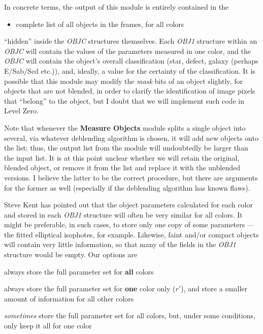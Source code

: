   In concrete terms, the output of this module is 
entirely contained in the 

\begin {itemize}
  \item complete list of all objects in the frames, for all colors
\end {itemize}

``hidden'' inside the {\it OBJC} structures themselves.  Each {\it OBJ1}
structure within an {\it OBJC} will contain the values of
the parameters measured in one color,
and the {\it OBJC} will contain the object's overall classification (star,
defect, galaxy (perhaps E/Sab/Scd etc.)), and, ideally,
a value for the certainty of the classification.
It is possible that this module may modify the {\it mask}
bits of an object slightly, for objects that are not
blended, in order to clarify the identification of image
pixels that ``belong'' to the object, but I doubt that
we will implement such code in Level Zero.

Note that whenever the {\bf Measure Objects} module 
splits a single object into several, via whatever deblending 
algorithm is chosen, it will add new objects onto the list;
thus, the output list from the module will undoubtedly be larger
than the input list.  It is at this point unclear whether we
will retain the original, blended object, or remove it from
the list and replace it with the unblended versions.  I believe
the latter to be the correct procedure, but there are arguments
for the former as well (especially if the deblending algorithm
has known flaws).

  Steve Kent has pointed out that the object parameters
calculated for each color and stored in 
each {\it OBJ1} structure will often be very similar for all colors.  
It might be preferable, in such cases, to store only one copy
of some parameters --- the fitted elliptical isophotes, for example.
Likewise, faint and/or compact objects will contain very
little information, so that many of the fields in the {\it OBJ1}
structure would be empty.
Our options are

\begin{description}
  \item always store the full parameter set for {\bf all} colors
  \item always store the full parameter set for {\bf one} color only ($r'$),
            and store a smaller amount of information for all other colors
  \item {\it sometimes} store the full parameter set for all colors,
            but, under some conditions, only keep it all for one color
\end{description}

